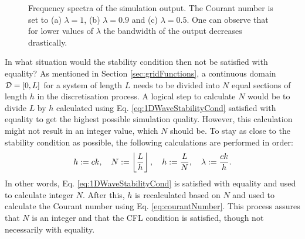 \begin{figure}[t]
    \caption{Frequency spectra of the simulation output. The Courant number is set to (a) $\lambda = 1$, (b) $\lambda = 0.9$ and (c) $\lambda = 0.5$. One can observe that for lower values of $
    \lambda$ the bandwidth of the output decreases drastically. \label{fig:1DWaveBandwidth}}
\end{figure}

In what situation would the stability condition then not be satisfied with equality? As mentioned in Section \ref{sec:gridFunctions}, a continuous domain $\mathcal{D} = [0,L]$ for a system of length $L$ needs to be divided into $N$ equal sections of length $h$ in the discretisation process. A logical step to calculate $N$ would be to divide $L$ by $h$ calculated using Eq. \eqref{eq:1DWaveStabilityCond} satisfied with equality to get the highest possible simulation quality. However, this calculation might not result in an integer value, which $N$ should be. To stay as close to the stability condition as possible, the following calculations are performed in order:
\begin{equation}\label{eq:orderOfCalc}
    h := ck, \quad N := \floor[\frac{L}{h}], \quad h := \frac{L}{N}, \quad \lambda := \frac{ck}{h}.
\end{equation}
In other words, Eq. \eqref{eq:1DWaveStabilityCond} is satisfied with equality and used to calculate integer $N$. After this, $h$ is recalculated based on $N$ and used to calculate the Courant number using Eq. \eqref{eq:courantNumber}. This process assures that $N$ is an integer and that the CFL condition is satisfied, though not necessarily with equality.

